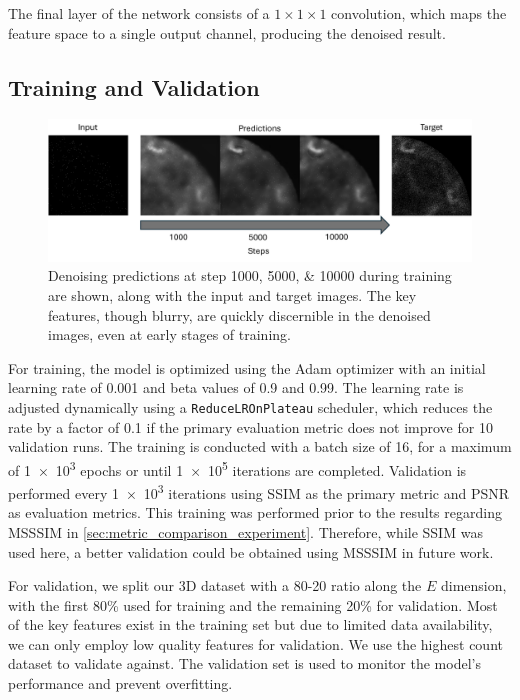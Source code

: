 The final layer of the network consists of a $1 \times 1 \times 1$ convolution, which maps the feature space to a single output channel, producing the denoised result.


\subsection{Training and Validation}
\begin{figure}
    \centering
    \includegraphics[width=1\linewidth]{images/training_progress_example2.pdf}
    \caption{Denoising predictions at step \numlist{1000;5000;10000} during training are shown, along with the input and target images. The key features, though blurry, are quickly discernible in the denoised images, even at early stages of training.}
    \label{fig:training-progress-example}
\end{figure}
For training, the model is optimized using the Adam optimizer with an initial learning rate of \num{0.001} and beta values of \num{0.9} and \num{0.99}. The learning rate is adjusted dynamically using a \texttt{ReduceLROnPlateau} scheduler, which reduces the rate by a factor of \num{0.1} if the primary evaluation metric does not improve for \num{10} validation runs. The training is conducted with a batch size of \num{16}, for a maximum of \num{1e3} epochs or until \num{1e5} iterations are completed. Validation is performed every \num{1e3} iterations using \gls{SSIM} as the primary metric and \gls{PSNR} as evaluation metrics. This training was performed prior to the results regarding \gls{MSSSIM} in \cref{sec:metric_comparison_experiment}. Therefore, while \gls{SSIM} was used here, a better validation could be obtained using \gls{MSSSIM} in future work.

For validation, we split our 3D dataset with a 80-20 ratio along the $E$ dimension, with the first 80\% used for training and the remaining 20\% for validation. Most of the key features exist in the training set but due to limited data availability, we can only employ low quality features for validation. We use the highest count dataset to validate against. The validation set is used to monitor the model's performance and prevent overfitting. 

